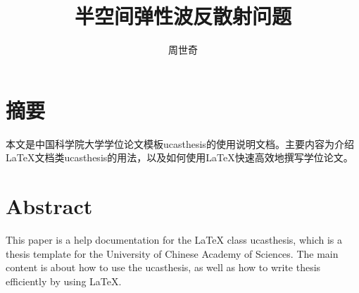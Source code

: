 \confidential{}%
\title{ 半空间弹性波反散射问题}%
\author{周世奇}%
\maketitle%
\makeenglishtitle%
\makedeclaration%
\chapter*{摘\quad 要}%
\setcounter{page}{1}%

本文是中国科学院大学学位论文模板ucasthesis的使用说明文档。主要内容为介绍\LaTeX{}文档类ucasthesis的用法，以及如何使用\LaTeX{}快速高效地撰写学位论文。

\chapter*{Abstract}%

This paper is a help documentation for the \LaTeX{} class ucasthesis, which is  a thesis template for the University of Chinese Academy of Sciences. The main content is about how to use the ucasthesis, as well as how to write thesis efficiently by using \LaTeX{}.

